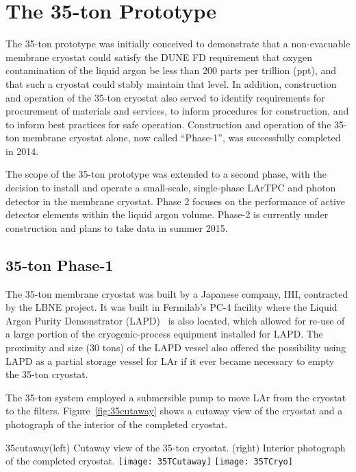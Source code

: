 \section{The 35-ton Prototype}
\label{sec:proto-35t}

The 35-ton prototype was initially conceived to demonstrate that a non-evacuable
membrane cryostat could satisfy the DUNE FD requirement that oxygen contamination
of the liquid argon be less than 200 parts per trillion (ppt), and that such a cryostat
could stably maintain that level.  In addition, construction and operation of the
35-ton cryostat also served to identify requirements for procurement of materials and services,
to inform procedures for construction, and to inform best practices for safe operation.
Construction and operation of the 35-ton membrane cryostat alone, now called ``Phase-1'',
was successfully completed in 2014.

The scope of the 35-ton prototype was extended to a second phase, with the decision to install
and operate a small-scale, single-phase LArTPC and photon detector in the membrane cryostat.
Phase 2 focuses on the performance of active detector elements within the liquid argon volume.
Phase-2 is currently under construction and plans to take data in summer 2015.

\subsection{35-ton Phase-1}

The 35-ton membrane cryostat was built by a Japanese company, IHI\cite{bib:ihicorp},
contracted by the LBNE project.  It was built in Fermilab's PC-4 facility where the Liquid Argon Purity
Demonstrator (LAPD)~\cite{bib:lapdP07005} is also located, which allowed for re-use of a large portion
 of the cryogenic-process equipment installed for LAPD.  The proximity and size (30 tons) of the LAPD
 vessel also offered the possibility using LAPD as a partial storage vessel for LAr if it ever
 became necessary to empty the 35-ton cryostat.

The 35-ton system employed a submersible pump to move LAr from the cryostat to the filters.
Figure~\ref{fig:35cutaway} shows a cutaway view of the cryostat and a photograph of the interior
of the completed cryostat.

\begin{cdrfigure}{35cutaway}{(left) Cutaway view of the 35-ton cryostat. (right) Interior
photograph of the completed cryostat.}
\texttt{[image: 35TCutaway]}
\texttt{[image: 35TCryo]}
\end{cdrfigure}

